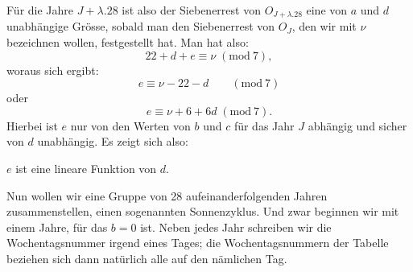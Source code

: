 Für die Jahre $J+\lambda\mathord{.}28$ ist also der Siebenerrest von $O_{J+\lambda\mathord{.}28}$ eine von
$a$ und $d$ unabhängige Grösse, sobald man den Siebenerrest von $O_J$, den wir
mit $\nu$ bezeichnen wollen, festgestellt hat. Man hat also:
\[
22+d+e\equiv\nu\; (\mathrm{mod}\ 7),
\]
\noindent woraus sich ergibt:
\[
e\equiv\nu-22-d\qquad(\mathrm{mod}\ 7)
\]
\noindent oder
\[
e\equiv\nu+6+6d\; (\mathrm{mod}\ 7).
\]
\noindent Hierbei ist $e$ nur von den Werten von $b$ und $c$ für das Jahr $J$ abhängig und
sicher von $d$ unabhängig. Es zeigt sich also:
\begin{center}$e$ ist eine lineare Funktion von $d$.\end{center}
\noindent\hspace*{\parindent}Nun wollen wir eine Gruppe von 28 aufeinanderfolgenden Jahren zusammenstellen, einen sogenannten Sonnenzyklus. Und zwar beginnen wir mit
einem Jahre, für das $b=0$ ist. Neben jedes Jahr schreiben wir die Wochentagsnummer irgend eines Tages; die Wochentagsnummern der Tabelle beziehen
sich dann natürlich alle auf den nämlichen Tag.
